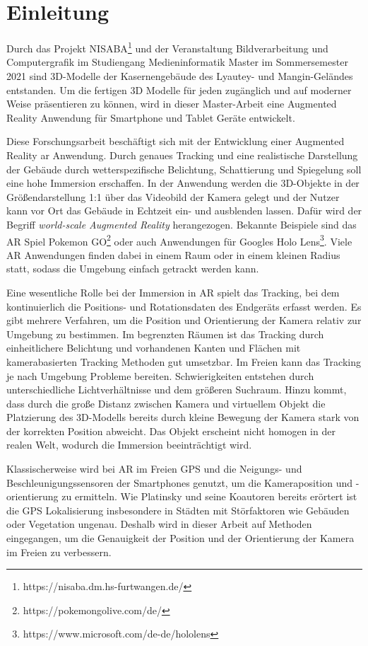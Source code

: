 \section{Einleitung}
Durch das Projekt NISABA\footnote{https://nisaba.dm.hs-furtwangen.de/} und der Veranstaltung Bildverarbeitung und Computergrafik im Studiengang Medieninformatik Master im Sommersemester 2021 sind 3D-Modelle der Kasernengebäude des Lyautey- und Mangin-Geländes entstanden. Um die fertigen 3D Modelle für jeden zugänglich und auf moderner Weise präsentieren zu können, wird in dieser Master-Arbeit eine Augmented Reality Anwendung für Smartphone und Tablet Geräte entwickelt.

Diese Forschungsarbeit beschäftigt sich mit der Entwicklung einer Augmented Reality \acrshort{ar} Anwendung. Durch genaues Tracking und eine realistische Darstellung der Gebäude durch wetterspezifische Belichtung, Schattierung und Spiegelung soll eine hohe Immersion erschaffen. In der Anwendung werden die 3D-Objekte in der Größendarstellung 1:1 über das Videobild der Kamera gelegt und der Nutzer kann vor Ort das Gebäude in Echtzeit ein- und ausblenden lassen. Dafür wird der Begriff \textit{world-scale Augmented Reality} herangezogen. Bekannte Beispiele sind das AR Spiel Pokemon GO\footnote{https://pokemongolive.com/de/} oder auch Anwendungen für Googles Holo Lens\footnote{https://www.microsoft.com/de-de/hololens}. Viele AR Anwendungen finden dabei in einem Raum oder in einem kleinen Radius statt, sodass die Umgebung einfach getrackt werden kann.

Eine wesentliche Rolle bei der Immersion in AR spielt das Tracking, bei dem kontinuierlich die Positions- und Rotationsdaten des Endgeräts erfasst werden. Es gibt mehrere Verfahren, um die Position und Orientierung der Kamera relativ zur Umgebung zu bestimmen. Im begrenzten Räumen ist das Tracking durch einheitlichere Belichtung und vorhandenen Kanten und Flächen mit kamerabasierten Tracking Methoden gut umsetzbar. Im Freien kann das Tracking je nach Umgebung Probleme bereiten. Schwierigkeiten entstehen durch unterschiedliche Lichtverhältnisse und dem größeren Suchraum. Hinzu kommt, dass durch die große Distanz zwischen Kamera und virtuellem Objekt die Platzierung des 3D-Modells bereits durch kleine Bewegung der Kamera stark von der korrekten Position abweicht. Das Objekt erscheint nicht homogen in der realen Welt, wodurch die Immersion beeinträchtigt wird.

Klassischerweise wird bei AR im Freien GPS und die Neigungs- und Beschleunigungssensoren der Smartphones genutzt, um die Kameraposition und -orientierung zu ermitteln. Wie Platinsky und seine Koautoren\cite{platinsky} bereits erörtert ist die GPS Lokalisierung insbesondere in Städten mit Störfaktoren wie Gebäuden oder Vegetation ungenau. Deshalb wird in dieser Arbeit auf Methoden eingegangen, um die Genauigkeit der Position und der Orientierung der Kamera im Freien zu verbessern.

